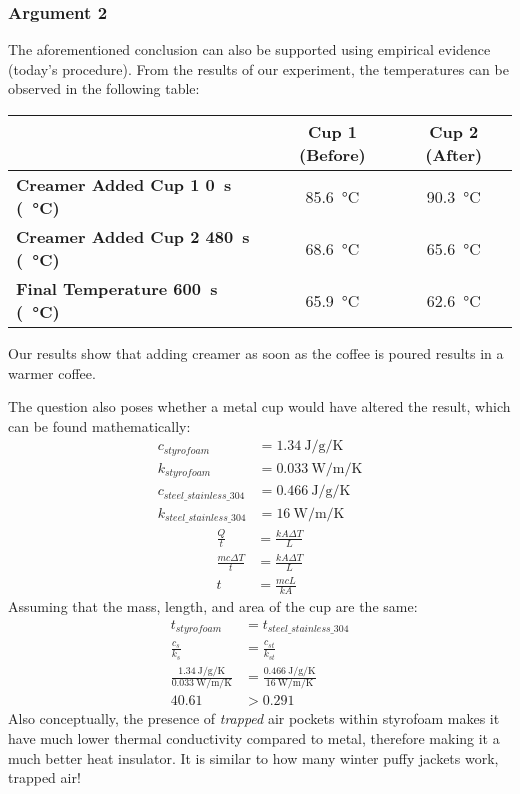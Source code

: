 \documentclass{article}
\begin{document}
\subsubsection{Argument 2}

The aforementioned conclusion can also be supported using empirical evidence (today's procedure). From the results of our experiment, the temperatures can be observed in the following table:

\begin{tabular}{ | l | c | c | }
	\hline
	& \textbf{Cup 1 (Before)} & \textbf{Cup 2 (After)} \\
	\hline
	\textbf{Creamer Added Cup 1 \SI{0}{\second} (\SI{}{\celsius})} & \SI{85.6}{\celsius} & \SI{90.3}{\celsius} \\
	\hline
	\textbf{Creamer Added Cup 2 \SI{480}{\second} (\SI{}{\celsius})} & \SI{68.6}{\celsius} & \SI{65.6}{\celsius} \\
	\hline
	\textbf{Final Temperature \SI{600}{\second} (\SI{}{\celsius})} & \SI{65.9}{\celsius} & \SI{62.6}{\celsius} \\
	\hline
\end{tabular}
Our results show that adding creamer as soon as the coffee is poured results in a warmer coffee.

The question also poses whether a metal cup would have altered the result, which can be found mathematically:
\begin{align*}
	c_{styrofoam} & = \SI{1.34}{\joule \per \gram \per \kelvin} \\
	k_{styrofoam} & = \SI{0.033}{\watt \per \meter \per \kelvin} \\
	c_{steel\_stainless\_304} & = \SI{0.466}{\joule \per \gram \per \kelvin} \\
	k_{steel\_stainless\_304} & = \SI{16}{\watt \per \meter \per \kelvin}
\end{align*}
\begin{align*}
	\frac{ Q }{ t } & = \frac{ kA\Delta T}{ L } \\
	\frac{ mc\Delta T }{ t } & = \frac{ kA\Delta T }{ L } \\
	t & = \frac{ mcL }{ kA }
\end{align*}
Assuming that the mass, length, and area of the cup are the same:
\begin{align*}
	t_{styrofoam} & = t_{steel\_stainless\_304} \\
	\frac{ c_{s} }{ k_{s} } & = \frac{ c_{st} }{ k_{st} } \\
	\frac{ \SI{1.34}{\joule \per \gram \per \kelvin} }{ \SI{0.033}{\watt \per \meter \per \kelvin} } & = \frac{ \SI{0.466}{\joule \per \gram \per \kelvin} }{ \SI{16}{\watt \per \meter \per \kelvin} } \\
	40.61 & > 0.291
\end{align*}
Also conceptually, the presence of \textit{trapped} air pockets within styrofoam makes it have much lower thermal conductivity compared to metal, therefore making it a much better heat insulator. It is similar to how many winter puffy jackets work, trapped air!
\end{document}
